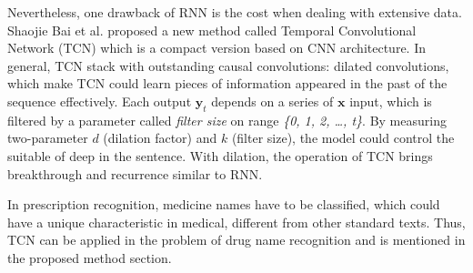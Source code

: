 Nevertheless, one drawback of RNN is the cost when dealing with extensive data. Shaojie Bai et al. \cite{bai2018empirical} proposed a new method called Temporal Convolutional Network (TCN) which is a compact version based on CNN architecture. In general, TCN stack with outstanding causal convolutions: dilated convolutions, which make TCN could learn pieces of information appeared in the past of the sequence effectively. Each output \(\textbf{y}_t\) depends on a series of \(\textbf{x}\) input, which is filtered by a parameter called \emph{filter size} on range \emph{\{0, 1, 2, …, t\}}. By measuring two-parameter \(d\) (dilation factor) and \(k\) (filter size), the model could control the suitable of deep in the sentence. With dilation, the operation of TCN brings breakthrough and recurrence similar to RNN. 


In prescription recognition, medicine names have to be classified, which could have a unique characteristic in medical, different from other standard texts. Thus, TCN can be applied in the problem of drug name recognition and is mentioned in the proposed method section.
